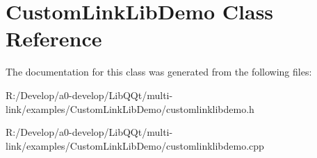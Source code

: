 \hypertarget{class_custom_link_lib_demo}{}\section{Custom\+Link\+Lib\+Demo Class Reference}
\label{class_custom_link_lib_demo}


The documentation for this class was generated from the following files\+:\begin{DoxyCompactItemize}
\item 
R\+:/\+Develop/a0-\/develop/\+Lib\+Q\+Qt/multi-\/link/examples/\+Custom\+Link\+Lib\+Demo/customlinklibdemo.\+h\item 
R\+:/\+Develop/a0-\/develop/\+Lib\+Q\+Qt/multi-\/link/examples/\+Custom\+Link\+Lib\+Demo/customlinklibdemo.\+cpp\end{DoxyCompactItemize}
